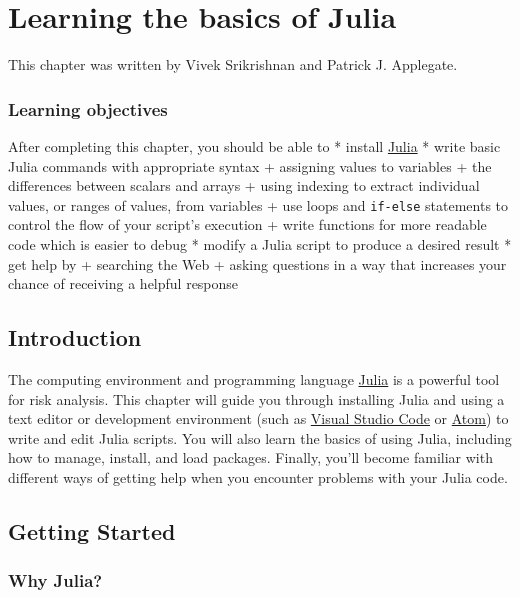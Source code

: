 \documentclass[
  11pt,
]{book}
\begin{document}
\hypertarget{sec:julia}{%
\chapter{Learning the basics of Julia}\label{sec:julia}}

This chapter was written by Vivek Srikrishnan and Patrick J. Applegate.

\hypertarget{learning-objectives}{%
\subsection*{Learning objectives}\label{learning-objectives}}


After completing this chapter, you should be able to * install \href{https://julialang.org}{Julia} * write basic Julia commands with appropriate syntax + assigning values to variables + the differences between scalars and arrays + using indexing to extract individual values, or ranges of values, from variables + use loops and \texttt{if-else} statements to control the flow of your script's execution + write functions for more readable code which is easier to debug * modify a Julia script to produce a desired result * get help by + searching the Web + asking questions in a way that increases your chance of receiving a helpful response

\hypertarget{introduction-1}{%
\section{Introduction}\label{introduction-1}}

The computing environment and programming language \href{http://julialang.org}{Julia} is a powerful tool for risk analysis. This chapter will guide you through installing Julia and using a text editor or development environment (such as \href{https://code.visualstudio.com/}{Visual Studio Code} or \href{https://atom.io/}{Atom}) to write and edit Julia scripts. You will also learn the basics of using Julia, including how to manage, install, and load packages. Finally, you'll become familiar with different ways of getting help when you encounter problems with your Julia code.

\hypertarget{getting-started}{%
\section{Getting Started}\label{getting-started}}

\hypertarget{why-julia}{%
\subsection{Why Julia?}\label{why-julia}}
\end{document}
